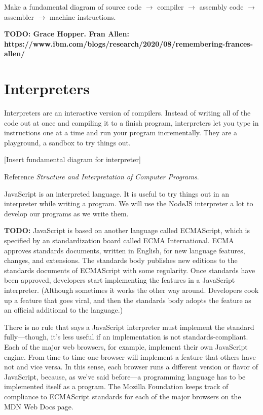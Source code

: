 Make a fundamental diagram of source code $\to$ compiler $\to$ assembly code
$\to$ assembler $\to$ machine instructions.

\textbf{TODO: Grace Hopper.
Fran Allen:
https://www.ibm.com/blogs/research/2020/08/remembering-frances-allen/}

\section{Interpreters}

Interpreters are an interactive version of compilers. Instead of writing all of
the code out at once and compiling it to a finish program, interpreters let you
type in instructions one at a time and run your program incrementally. They are
a playground, a sandbox to try things out.

[Insert fundamental diagram for interpreter]

Reference \textit{Structure and Interpretation of Computer Programs}.

JavaScript is an interpreted language. It is useful to try things out in an
interpreter while writing a program. We will use the NodeJS interpreter a lot to
develop our programs as we write them.

\textbf{TODO:} JavaScript is based on another language called ECMAScript, which
is specified by an standardization board called ECMA International. ECMA
approves standards documents, written in English, for new language features,
changes, and extensions. The standards body publishes new editions to the
standards documents of ECMAScript with some regularity. Once standards have been
approved, developers start implementing the features in a JavaScript
interpreter. (Although sometimes it works the other way around. Developers cook
up a feature that goes viral, and then the standards body adopts the feature as
an official additional to the language.)

There is no rule that says a JavaScript interpreter must implement the standard
fully---though, it's less useful if an implementation is not
standards-compliant. Each of the major web browsers, for example, implement
their own JavaScript engine. From time to time one browser will implement a
feature that others have not and vice versa. In this sense, each browser runs a
different version or flavor of JavaScript, because, as we've said before---a
programming language has to be implemented itself as a program. The Mozilla
Foundation keeps track of compliance to ECMAScript standards for each of the
major browsers on the MDN Web Docs
page.

